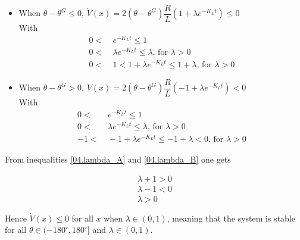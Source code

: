 \begin{itemize}
  \item When $\theta - \theta^G \leq 0$, $\dot{V}(x) = 2 (\theta - \theta^G) \dfrac{R}{L} (1 + \lambda e^{-K_L t}) \leq 0$ \\
    With
    \begin{align}
      0 <&\ e^{-K_L t} \leq 1 \nonumber \\
      0 <&\ \lambda e^{-K_L t} \leq \lambda \text{, for $\lambda > 0$} \nonumber \\
      0 <&\ 1 < 1 + \lambda e^{-K_L t} \leq 1 + \lambda \text{, for $\lambda > 0$} \label{04.lambda_A}
    \end{align}
  \item When $\theta - \theta^G > 0$, $\dot{V}(x) = 2 (\theta - \theta^G) \dfrac{R}{L} (-1 + \lambda e^{-K_L t}) < 0$  \\
    With
    \begin{align}
      0 <&\ e^{-K_L t} \leq 1 \nonumber \\
      0 <&\ \lambda e^{-K_L t} \leq \lambda \text{, for $\lambda > 0$} \nonumber \\
      -1 <&\ -1 + \lambda e^{-K_L t} \leq -1 + \lambda < 0 \text{, for $\lambda > 0$} \label{04.lambda_B}
    \end{align}
\end{itemize}

From inequalities \ref{04.lambda_A} and \ref{04.lambda_B} one gets

\begin{align*}
  \lambda + 1 > 0 \\
  \lambda - 1 < 0 \\
  \lambda > 0
\end{align*}

Hence $\dot{V}(x) \leq 0$ for all $x$ when $\lambda \in (0,1)$, meaning that the
system is stable for all $\theta \in (-180^{\circ}, 180^{\circ}]$ and
$\lambda \in (0,1)$.
